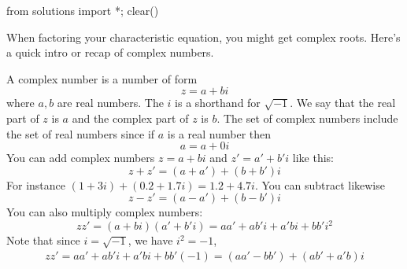 \begin{python0}
from solutions import *; clear() 
\end{python0}

When factoring your characteristic equation, you might get
complex roots.
Here's a quick intro or recap of complex numbers.

A complex number is a number of form
\[
z = a + bi
\]
where $a, b$ are real numbers.
The $i$ is a shorthand for $\sqrt{-1}$.
We say that the real part of $z$ is $a$ and the complex part of $z$ is $b$.
The set of complex numbers include the set of real numbers since
if $a$ is a real number then
\[
a = a + 0i
\]
You can add complex numbers $z = a + bi$ and $z' = a' + b'i$ like this:
\[
z + z' = (a+a') + (b+b')i
\]
For instance $(1+3i) + (0.2 + 1.7i) = 1.2 + 4.7i$. 
You can subtract likewise
\[
z - z' = (a-a') + (b-b')i
\]
You can also multiply complex numbers:
\[
zz' = (a + bi)(a' + b'i) = aa' + ab'i + a'bi + bb'i^2
\]
Note that since $i = \sqrt{-1}$, we have $i^2 = -1$,
\begin{align*}
zz' = aa' + ab'i + a'bi + bb'(-1) = (aa' - bb') + (ab' + a'b)i
\end{align*}


